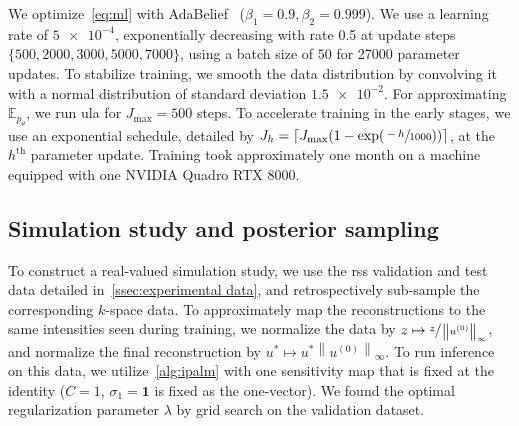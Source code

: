 \documentclass[twocolumn]{article}
\newcommand{\norm}[1]{\left\lVert#1\right\rVert}
\begin{document}
We optimize~\cref{eq:ml} with AdaBelief~\cite{zhuang2020adabelief} (\( \beta_1 = 0.9, \beta_2 = 0.999 \)).
We use a learning rate of \( \num{5e-4} \), exponentially decreasing with rate \num{0.5} at update steps \( \{ \num{500}, \num{2000}, \num{3000}, \num{5000}, \num{7000} \} \), using a batch size of \( 50 \) for \num{27000} parameter updates.
To stabilize training, we smooth the data distribution by convolving it with a normal distribution of standard deviation \( \num{1.5e-2} \).
For approximating \( \mathbb{E}_{p_\theta} \), we run \gls{ula} for \( J_{\text{max}} = 500 \) steps.
To accelerate training in the early stages, we use an exponential schedule, detailed by \( J_h = \lceil J_{\text{max}} (1 - \exp(\sfrac{-h}{\num{1000}})) \rceil \), at the \( h^{\text{th}} \) parameter update.
Training took approximately one month on a machine equipped with one NVIDIA Quadro RTX 8000.
\subsection{Simulation study and posterior sampling}%
\label{ssec:simulation study}
To construct a real-valued simulation study, we use the \gls{rss} validation and test data detailed in~\cref{ssec:experimental data}, and retrospectively sub-sample the corresponding \( k \)-space data.
To approximately map the reconstructions to the same intensities seen during training, we normalize the data by \( z \mapsto \sfrac{z}{\norm{u^{(0)}}_\infty} \), and normalize the final reconstruction by \( u^{*} \mapsto u^{*}\norm{u^{(0)}}_\infty \).
To run inference on this data, we utilize~\cref{alg:ipalm} with one sensitivity map that is fixed at the identity (\( C = 1 \), \( \sigma_1 = \mathbf{1} \) is fixed as the one-vector).
We found the optimal regularization parameter \( \lambda \) by grid search on the validation dataset.
\end{document}
